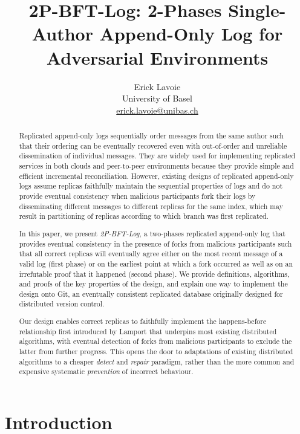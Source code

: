 \documentclass[9pt, oneside]{article}   	%
\title{2P-BFT-Log: 2-Phases Single-Author Append-Only Log for Adversarial Environments}
\author{Erick Lavoie \\
University of Basel \\
\href{mailto:erick.lavoie@unibas.ch}{erick.lavoie@unibas.ch}}
\begin{document}
\maketitle


\begin{abstract}
Replicated append-only logs sequentially order messages from the same author such that their ordering can be eventually recovered even with out-of-order and unreliable dissemination of individual messages. They are widely used for implementing replicated services in both clouds and peer-to-peer environments because they provide simple and efficient incremental reconciliation. However, existing designs of replicated append-only logs assume replicas faithfully maintain the sequential properties of logs and do not provide eventual consistency when malicious participants fork their logs by disseminating different messages to different replicas for the same index, which may result in partitioning of replicas according to which branch was first replicated.
 
In this paper, we present \textit{2P-BFT-Log}, a two-phases replicated append-only log that provides eventual consistency in the presence of forks from malicious participants such that all correct replicas will eventually agree either on the most recent message of a valid log (first phase) or on the earliest point at which a fork occurred as well as on an irrefutable proof that it happened (second phase). We provide definitions, algorithms, and proofs of the key properties of the design, and explain one way to implement the design onto Git, an eventually consistent replicated database originally designed for distributed version control.

Our design enables correct replicas to faithfully implement the happens-before relationship first introduced by Lamport that underpins most existing distributed algorithms, with eventual detection of forks from malicious participants to exclude the latter from further progress. This opens the door to adaptations of existing distributed algorithms to a cheaper \textit{detect} and \textit{repair} paradigm, rather than the more common and expensive systematic \textit{prevention} of incorrect behaviour.
\end{abstract}

\section{Introduction}
\label{sec:introduction}
\end{document}
